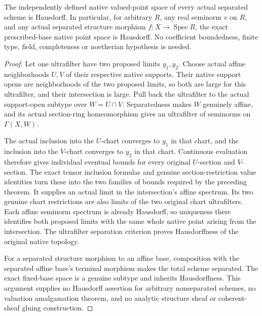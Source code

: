 \begin{theorem}
\label{scheme:separated-native-hausdorff}
\leanok
{}
The independently defined native valued-point space of every actual
separated scheme is Hausdorff. In particular, for arbitrary $R$, any real
seminorm $v$ on $R$, and any actual separated structure morphism
$f:X\to\operatorname{Spec}R$, the exact prescribed-base native point
space is Hausdorff. No coefficient boundedness, finite type, field,
completeness or noetherian hypothesis is needed.
\end{theorem}
\begin{proof}
Let one ultrafilter have two proposed limits $y_1,y_2$. Choose actual affine
neighborhoods $U,V$ of their respective native supports. Their native
support opens are neighborhoods of the two proposed limits, so both
are large for this ultrafilter, and their intersection is large. Pull
back the ultrafilter to the actual support-open subtype over
$W=U\cap V$. Separatedness makes $W$ genuinely affine, and its actual
section-ring homeomorphism gives an ultrafilter of seminorms on
$\Gamma(X,W)$.

The actual inclusion into the $U$-chart converges to $y_1$ in that chart,
and the inclusion into the $V$-chart converges to $y_2$ in that chart.
Continuous evaluation therefore gives individual eventual bounds for
every original $U$-section and $V$-section. The exact tensor inclusion
formulas and genuine section-restriction value identities turn these
into the two families of bounds required by the preceding theorem.
It supplies an actual limit in the intersection's affine spectrum.
Its two genuine chart restrictions are also limits of the two original
chart ultrafilters. Each affine seminorm spectrum is already Hausdorff,
so uniqueness there identifies both proposed limits with the same whole
native point arising from the intersection. The ultrafilter separation
criterion proves Hausdorffness of the original native topology.

For a separated structure morphism to an affine base, composition with
the separated affine base's terminal morphism makes the total scheme
separated. The exact fixed-base space is a genuine subtype and inherits
Hausdorffness. This argument supplies no Hausdorff assertion for arbitrary
nonseparated schemes, no valuation amalgamation theorem, and no analytic
structure sheaf or coherent-sheaf gluing construction.
\end{proof}
